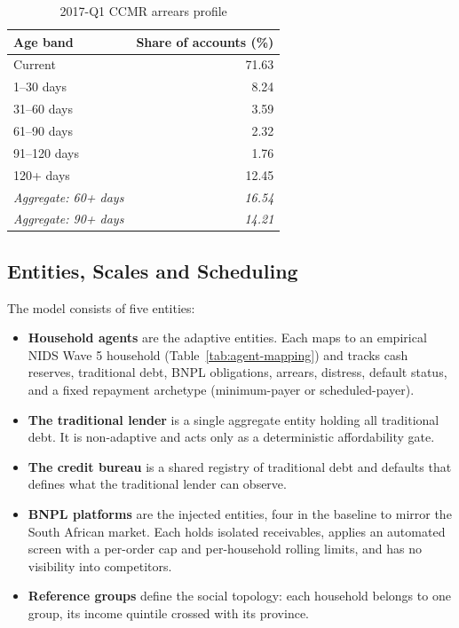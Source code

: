 \begin{table}[H]
\centering
\caption{2017-Q1 \ac{CCMR} arrears profile}
\label{tab:ccmr}
\begin{tabular}{lr}
\toprule
\textbf{Age band} & \textbf{Share of accounts (\%)} \\
\midrule
Current                  & 71.63 \\
1--30 days               &  8.24 \\
31--60 days              &  3.59 \\
61--90 days              &  2.32 \\
91--120 days             &  1.76 \\
120+ days                & 12.45 \\
\midrule
\emph{Aggregate: 60+ days}  & \emph{16.54} \\
\emph{Aggregate: 90+ days}  & \emph{14.21} \\
\bottomrule
\end{tabular}
\end{table}

\subsection{Entities, Scales and Scheduling}
\label{sec:entities}

The model consists of five entities:
\begin{itemize}
    \item \textbf{Household agents} are the adaptive entities. Each maps to an empirical
    \ac{NIDS} Wave 5 household (Table~\ref{tab:agent-mapping}) and tracks cash reserves,
    traditional debt, \ac{BNPL} obligations, arrears, distress, default status, and a fixed
    repayment archetype (minimum-payer or scheduled-payer).
    \item \textbf{The traditional lender} is a single aggregate entity holding all traditional
    debt. It is non-adaptive and acts only as a deterministic affordability gate.
    \item \textbf{The credit bureau} is a shared registry of traditional debt and defaults that
    defines what the traditional lender can observe.
    \item \textbf{\ac{BNPL} platforms} are the injected entities, four in the baseline to mirror
    the South African market. Each holds isolated receivables, applies an automated screen with a
    per-order cap and per-household rolling limits, and has no visibility into competitors.
    \item \textbf{Reference groups} define the social topology: each household belongs to one
    group, its income quintile crossed with its province.
\end{itemize}

